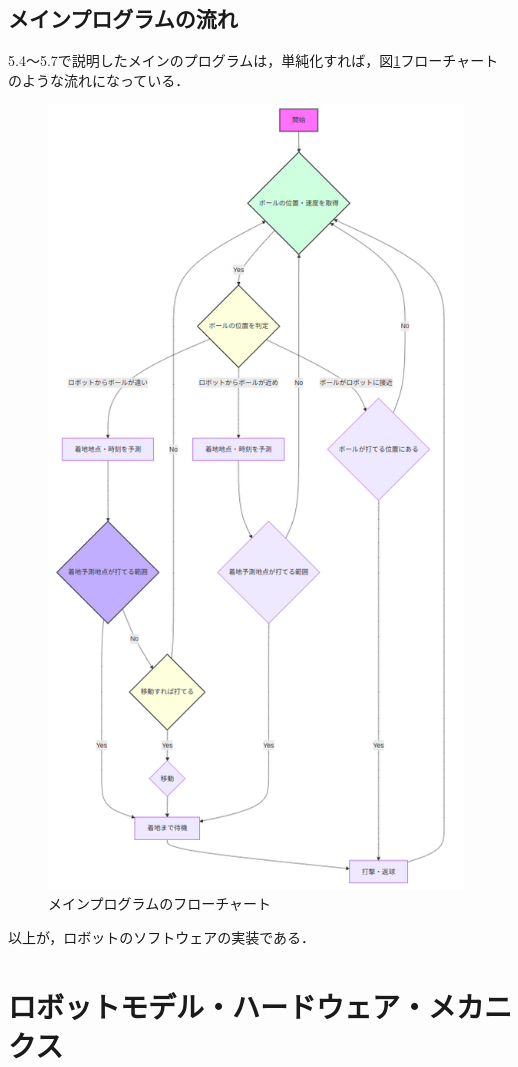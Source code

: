 \documentclass[10pt, oneside, titlepage]{ltjarticle}  %
\begin{document}
  \subsection{メインプログラムの流れ}
  5.4〜5.7で説明したメインのプログラムは，単純化すれば，図\ref{flow}フローチャートのような流れになっている．
  \begin{figure}[H]
    \centering
    \includegraphics[width=11cm]{figures/flow.png}
    \caption{メインプログラムのフローチャート}
    \label{flow}
  \end{figure}
  以上が，ロボットのソフトウェアの実装である．
\section{ロボットモデル・ハードウェア・メカニクス}
\end{document}

